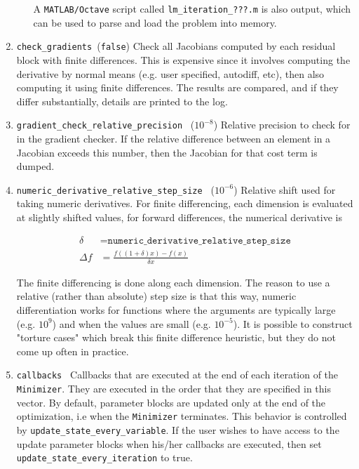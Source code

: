 \begin{enumerate}
\begin{itemize}
   A \texttt{MATLAB/Octave} script called \texttt{lm\_iteration\_???.m} is also output,
   which can be used to parse and load the problem into memory.
\end{itemize}



\item{\texttt{check\_gradients }}(\texttt{false})
 Check all Jacobians computed by each residual block with finite
     differences. This is expensive since it involves computing the
     derivative by normal means (e.g. user specified, autodiff,
     etc), then also computing it using finite differences. The
     results are compared, and if they differ substantially, details
     are printed to the log.

\item{\texttt{gradient\_check\_relative\_precision }} ($10^{-8}$)
  Relative precision to check for in the gradient checker. If the
  relative difference between an element in a Jacobian exceeds
  this number, then the Jacobian for that cost term is dumped.

\item{\texttt{numeric\_derivative\_relative\_step\_size }} ($10^{-6}$)
 Relative shift used for taking numeric derivatives. For finite
     differencing, each dimension is evaluated at slightly shifted
     values, \eg for forward differences, the numerical derivative is

\begin{align}
 \delta &= \texttt{numeric\_derivative\_relative\_step\_size}\\
 \Delta f &= \frac{f((1 + \delta)  x) - f(x)}{\delta x}
\end{align}

The finite differencing is done along each dimension. The
reason to use a relative (rather than absolute) step size is
that this way, numeric differentiation works for functions where
the arguments are typically large (e.g. $10^9$) and when the
values are small (e.g. $10^{-5}$). It is possible to construct
"torture cases" which break this finite difference heuristic,
but they do not come up often in practice.

\item{\texttt{callbacks }}
  Callbacks that are executed at the end of each iteration of the
\texttt{Minimizer}. They are executed in the order that they are
specified in this vector. By default, parameter blocks are
updated only at the end of the optimization, i.e when the
\texttt{Minimizer} terminates. This behavior is controlled by
\texttt{update\_state\_every\_variable}. If the user wishes to have access
to the update parameter blocks when his/her callbacks are
executed, then set \texttt{update\_state\_every\_iteration} to true.


\end{enumerate}

